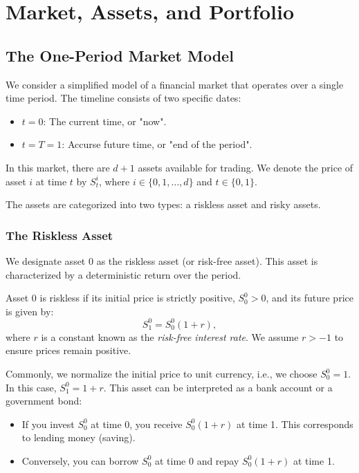\chapter{Market, Assets, and Portfolio}

\section{The One-Period Market Model}

We consider a simplified model of a financial market that operates over a single time period. The timeline consists of two specific dates:
\begin{itemize}
    \item $t=0$: The current time, or "now".
    \item $t=T=1$: Accurse future time, or "end of the period".
\end{itemize}

In this market, there are $d+1$ assets available for trading. We denote the price of asset $i$ at time $t$ by $S_t^i$, where $i \in \{0, 1, \dots, d\}$ and $t \in \{0, 1\}$.

The assets are categorized into two types: a riskless asset and risky assets.

\subsection{The Riskless Asset}

We designate asset $0$ as the riskless asset (or risk-free asset). This asset is characterized by a deterministic return over the period.

\begin{definition}
Asset $0$ is riskless if its initial price is strictly positive, $S_0^0 > 0$, and its future price is given by:
\begin{equation}
    S_1^0 = S_0^0 (1+r),
\end{equation}
where $r$ is a constant known as the \textit{risk-free interest rate}. We assume $r > -1$ to ensure prices remain positive.
\end{definition}

Commonly, we normalize the initial price to unit currency, i.e., we choose $S_0^0 = 1$. In this case, $S_1^0 = 1+r$.
This asset can be interpreted as a bank account or a government bond:
\begin{itemize}
    \item If you invest $S_0^0$ at time 0, you receive $S_0^0(1+r)$ at time 1. This corresponds to lending money (saving).
    \item Conversely, you can borrow $S_0^0$ at time 0 and repay $S_0^0(1+r)$ at time 1.
\end{itemize}

